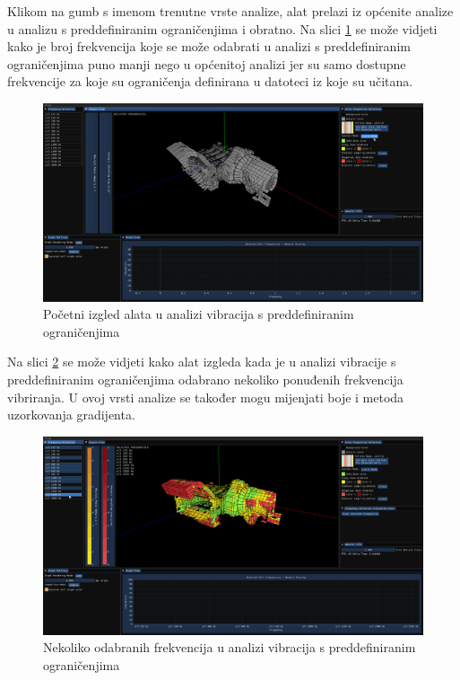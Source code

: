 \documentclass[times, utf8, diplomski]{fer}
\begin{document}
Klikom na gumb s imenom trenutne vrste analize, alat prelazi iz općenite analize u analizu s preddefiniranim ograničenjima i obratno. Na slici \ref{fig:limits-mode-switched} se može vidjeti kako je broj frekvencija koje se može odabrati u analizi s preddefiniranim ograničenjima puno manji nego u općenitoj analizi jer su samo dostupne frekvencije za koje su ograničenja definirana u datoteci iz koje su učitana.

\begin{figure} [H]
	\centering
    \includegraphics[width=\textwidth]{demonstration/limits_mode_opened.png}
    \caption{Početni izgled alata u analizi vibracija s preddefiniranim ograničenjima}
    \label{fig:limits-mode-switched}
\end{figure}

Na slici \ref{fig:limits-mode-frq-selected} se može vidjeti kako alat izgleda kada je u analizi vibracije s preddefiniranim ograničenjima odabrano nekoliko ponuđenih frekvencija vibriranja. U ovoj vrsti analize se također mogu mijenjati boje i metoda uzorkovanja gradijenta.

\begin{figure} [H]
	\centering
    \includegraphics[width=\textwidth]{demonstration/limits_mode_frq_selected.png}
    \caption{Nekoliko odabranih frekvencija u analizi vibracija s preddefiniranim ograničenjima}
    \label{fig:limits-mode-frq-selected}
\end{figure}
\end{document}
